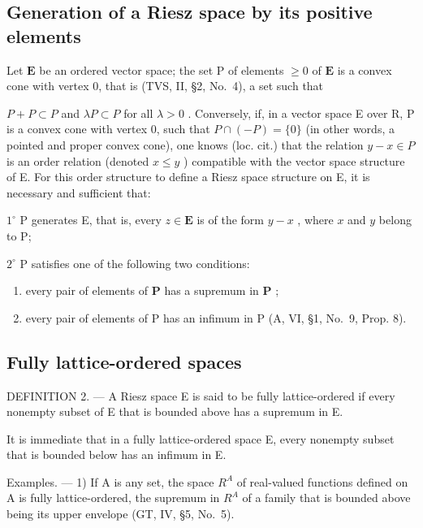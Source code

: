 \subsection{Generation of a Riesz space by its positive elements}

Let \(\mathbf{E}\) be an ordered vector space; the set \(\mathrm{P}\) of elements \(\geqslant 0\) of \(\mathbf{E}\) is a convex cone with vertex 0, that is (TVS, II, §2, No.~4), a set such that

\(P + P \subset P\) and \(\lambda P \subset P\) for all \(\lambda > 0\) . Conversely, if, in a vector space E over R, P is a convex cone with vertex 0, such that \(P \cap (-P) = \{0\}\) (in other words, a pointed and proper convex cone), one knows (loc. cit.) that the relation \(y - x \in P\) is an order relation (denoted \(x \leqslant y\) ) compatible with the vector space structure of E. For this order structure to define a Riesz space structure on E, it is necessary and sufficient that:

\(1^{\circ}\) P generates E, that is, every \(z \in \mathbf{E}\) is of the form \(y - x\) , where \(x\) and \(y\) belong to P;

\(2^{\circ}\) P satisfies one of the following two conditions:

\begin{enumerate}
\def\labelenumi{\alph{enumi})}
\item
  every pair of elements of \(\mathbf{P}\) has a supremum in \(\mathbf{P}\) ;
\item
  every pair of elements of P has an infimum in P (A, VI, §1, No.~9, Prop. 8).
\end{enumerate}

\subsection{Fully lattice-ordered spaces}

DEFINITION 2. --- A Riesz space E is said to be fully lattice-ordered if every nonempty subset of E that is bounded above has a supremum in E.

It is immediate that in a fully lattice-ordered space E, every nonempty subset that is bounded below has an infimum in E.

Examples. --- 1) If A is any set, the space \(R^{A}\) of real-valued functions defined on A is fully lattice-ordered, the supremum in \(R^{A}\) of a family that is bounded above being its upper envelope (GT, IV, §5, No.~5).

